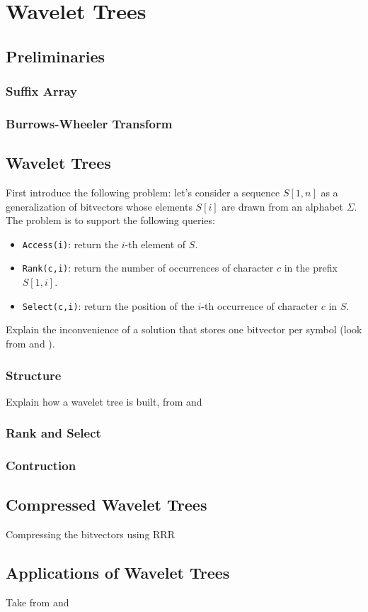 
\chapter{Wavelet Trees} %

\label{ch:Chapter3} %

\section{Preliminaries}
\subsection{Suffix Array}
\subsection{Burrows-Wheeler Transform}

\section{Wavelet Trees}
First introduce the following problem: let's consider a sequence $S[1,n]$ as a generalization of bitvectors whose elements $S[i]$ are drawn from an alphabet $\Sigma$. The problem is to support the following queries:

\begin{itemize}
    \item \texttt{Access(i)}: return the $i$-th element of $S$.
    \item \texttt{Rank(c,i)}: return the number of occurrences of character $c$ in the prefix $S[1,i]$.
    \item \texttt{Select(c,i)}: return the position of the $i$-th occurrence of character $c$ in $S$.
\end{itemize}

Explain the inconvenience of a solution that stores one bitvector per symbol (look from \cite{navarro2016compact} and \cite{ferragina2023pearls}).

\subsection{Structure}

Explain how a wavelet tree is built, from \cite{navarro2016compact} and \cite{GrossiWT2003}

\subsection{Rank and Select}

\subsection{Contruction}

\section{Compressed Wavelet Trees}
Compressing the bitvectors using RRR

\section{Applications of Wavelet Trees}
Take from \cite{WTForALL} and \cite{WTFromTheoryToPractice}
